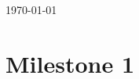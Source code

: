 \documentclass{article}
\begin{document}
\begin{titlepage}


	\vfill\vfill\vfill %

	{\large\today} %




	\vfill %

\end{titlepage}

%

\part*{Milestone 1}
\setcounter{section}{0}
\end{document}
